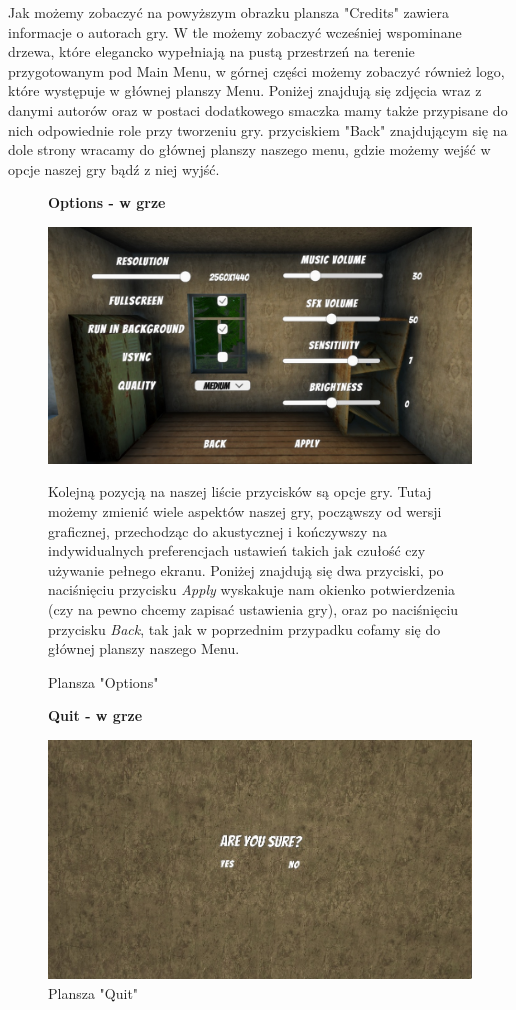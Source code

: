 Jak możemy zobaczyć na powyższym obrazku plansza "Credits" zawiera informacje o autorach gry. W tle możemy zobaczyć wcześniej wspominane drzewa, które elegancko wypełniają na pustą przestrzeń na terenie przygotowanym pod Main Menu, w górnej części możemy zobaczyć również logo, które występuje w głównej planszy Menu. Poniżej znajdują się zdjęcia wraz z danymi autorów oraz w postaci dodatkowego smaczka mamy także przypisane do nich odpowiednie role przy tworzeniu gry. przyciskiem "Back" znajdującym się na dole strony wracamy do głównej planszy naszego menu, gdzie możemy wejść w opcje naszej gry bądź z niej wyjść.\\

\begin{figure}[h]
    \begin{center}
    {\bfseries Options - w grze}
    \end{center}
    \centering
    \includegraphics[width=0.75\linewidth]{Images/menuUpdated.jpg}
    \caption{Plansza "Options"}
    \begin{flushleft}
    Kolejną pozycją na naszej liście przycisków są opcje gry. Tutaj możemy zmienić wiele aspektów naszej gry, począwszy od wersji graficznej, przechodząc do akustycznej i kończywszy na indywidualnych preferencjach ustawień takich jak czułość czy używanie pełnego ekranu. Poniżej znajdują się dwa przyciski, po naciśnięciu przycisku \textit{Apply} wyskakuje nam okienko potwierdzenia (czy na pewno chcemy zapisać ustawienia gry), oraz po naciśnięciu przycisku \textit{Back}, tak jak w poprzednim przypadku cofamy się do głównej planszy naszego Menu.\\
    \end{flushleft}
\end{figure}
\FloatBarrier
\begin{figure}[h]
\begin{center}
{\bfseries Quit - w grze}
\end{center}
    \centering
    \includegraphics[width=0.75\linewidth]{Images/QuitInGame.jpg}
    \caption{Plansza "Quit"}
\end{figure}
\FloatBarrier

